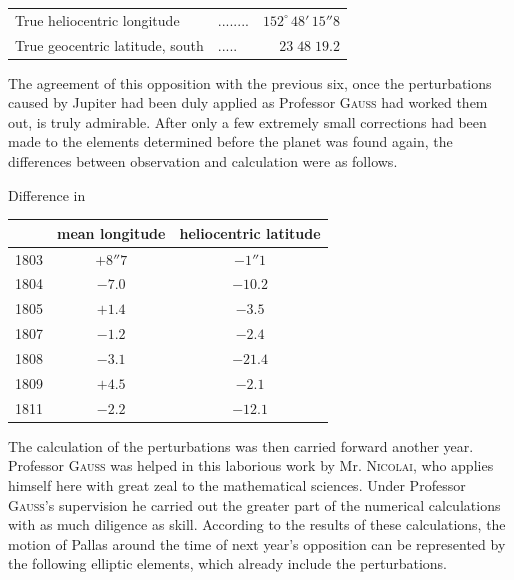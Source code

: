 \begin{center}\fontsize{10}{12}\selectfont\setlength{\tabcolsep}{4pt}\renewcommand{\arraystretch}{1.15}\begin{tabular}{llr}
True heliocentric longitude & .\;.\;.\;.\;.\;.\;.\;. & $152^\circ\,48'\,15''8$\\
True geocentric latitude, south & .\;.\;.\;.\;. & $23\;48\;19.2$\\
\end{tabular}\end{center}

\par\indent The agreement of this opposition with the previous six, once the perturbations caused by Jupiter had been duly applied as Professor \textsc{Gauss} had worked them out, is truly admirable. After only a few extremely small corrections had been made to the elements determined before the planet was found again, the differences between observation and calculation were as follows.
\begin{center}\fontsize{10}{12}\selectfont\setlength{\tabcolsep}{4pt}\renewcommand{\arraystretch}{1.15}
Difference in

\begin{tabular}{c|c|c}
 & mean longitude & heliocentric latitude \\
\hline
1803 & $+8''7$ & $-1''1$ \\
1804 & $-7.0$ & $-10.2$ \\
1805 & $+1.4$ & $-3.5$ \\
1807 & $-1.2$ & $-2.4$ \\
1808 & $-3.1$ & $-21.4$ \\
1809 & $+4.5$ & $-2.1$ \\
1811 & $-2.2$ & $-12.1$ \\
\end{tabular}
\end{center}


\par\indent The calculation of the perturbations was then carried forward another year. Professor \textsc{Gauss} was helped in this laborious work by Mr. \textsc{Nicolai}, who applies himself here with great zeal to the mathematical sciences. Under Professor \textsc{Gauss}’s supervision he carried out the greater part of the numerical calculations with as much diligence as skill. According to the results of these calculations, the motion of Pallas around the time of next year’s opposition can be represented by the following elliptic elements, which already include the perturbations.


